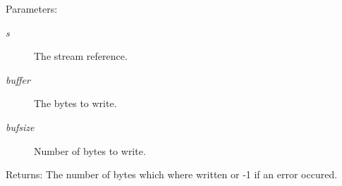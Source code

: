 \begin{Desc}
\item[Parameters:]
\begin{description}
\item[{\em s}]The stream reference. \item[{\em buffer}]The bytes to write. \item[{\em bufsize}]Number of bytes to write.\end{description}
\end{Desc}
\begin{Desc}
\item[Returns:]The number of bytes which where written or -1 if an error occured. \end{Desc}

